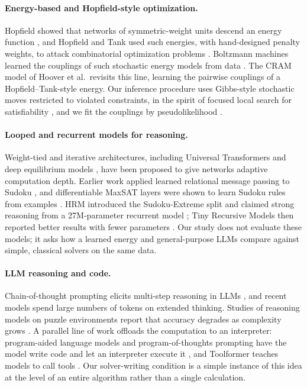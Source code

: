 \documentclass{article} %
\begin{document}
\paragraph{Energy-based and Hopfield-style optimization.}
Hopfield showed that networks of symmetric-weight units descend an energy function \citep{hopfield1982}, and Hopfield and Tank used such energies, with hand-designed penalty weights, to attack combinatorial optimization problems \citep{hopfield1985tsp}. Boltzmann machines learned the couplings of such stochastic energy models from data \citep{ackley1985boltzmann}. The CRAM model of Hoover et al.\ revisits this line, learning the pairwise couplings of a Hopfield--Tank-style energy. Our inference procedure uses Gibbs-style stochastic moves \citep{geman1984} restricted to violated constraints, in the spirit of focused local search for satisfiability \citep{selman1994noise}, and we fit the couplings by pseudolikelihood \citep{besag1975}.

\paragraph{Looped and recurrent models for reasoning.}
Weight-tied and iterative architectures, including Universal Transformers \citep{dehghani2019universal} and deep equilibrium models \citep{bai2019deq}, have been proposed to give networks adaptive computation depth. Earlier work applied learned relational message passing to Sudoku \citep{palm2018rrn}, and differentiable MaxSAT layers were shown to learn Sudoku rules from examples \citep{wang2019satnet}. HRM introduced the Sudoku-Extreme split and claimed strong reasoning from a 27M-parameter recurrent model \citep{wang2025hrm}; Tiny Recursive Models then reported better results with fewer parameters \citep{jolicoeur2025trm}. Our study does not evaluate these models; it asks how a learned energy and general-purpose LLMs compare against simple, classical solvers on the same data.

\paragraph{LLM reasoning and code.}
Chain-of-thought prompting elicits multi-step reasoning in LLMs \citep{wei2022cot}, and recent models spend large numbers of tokens on extended thinking. Studies of reasoning models on puzzle environments report that accuracy degrades as complexity grows \citep{shojaee2025illusion}. A parallel line of work offloads the computation to an interpreter: program-aided language models and program-of-thoughts prompting have the model write code and let an interpreter execute it \citep{gao2023pal,chen2022pot}, and Toolformer teaches models to call tools \citep{schick2023toolformer}. Our solver-writing condition is a simple instance of this idea at the level of an entire algorithm rather than a single calculation.
\end{document}
